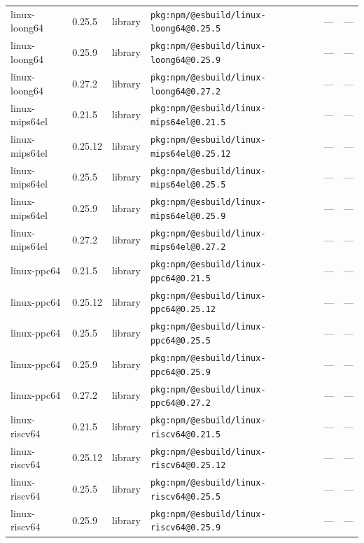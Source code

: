 \documentclass[11pt,a4paper]{article}
\begin{document}
\begin{longtable}{|p{4cm}|p{2cm}|p{1.6cm}|p{5cm}|p{1.5cm}|p{3.5cm}|}
\raggedright linux-loong64 & 0.25.5 & library & \small\texttt{pkg:npm/@esbuild/linux-loong64@0.25.5} & — & \small — \\
\raggedright linux-loong64 & 0.25.9 & library & \small\texttt{pkg:npm/@esbuild/linux-loong64@0.25.9} & — & \small — \\
\raggedright linux-loong64 & 0.27.2 & library & \small\texttt{pkg:npm/@esbuild/linux-loong64@0.27.2} & — & \small — \\
\raggedright linux-mips64el & 0.21.5 & library & \small\texttt{pkg:npm/@esbuild/linux-mips64el@0.21.5} & — & \small — \\
\raggedright linux-mips64el & 0.25.12 & library & \small\texttt{pkg:npm/@esbuild/linux-mips64el@0.25.12} & — & \small — \\
\raggedright linux-mips64el & 0.25.5 & library & \small\texttt{pkg:npm/@esbuild/linux-mips64el@0.25.5} & — & \small — \\
\raggedright linux-mips64el & 0.25.9 & library & \small\texttt{pkg:npm/@esbuild/linux-mips64el@0.25.9} & — & \small — \\
\raggedright linux-mips64el & 0.27.2 & library & \small\texttt{pkg:npm/@esbuild/linux-mips64el@0.27.2} & — & \small — \\
\raggedright linux-ppc64 & 0.21.5 & library & \small\texttt{pkg:npm/@esbuild/linux-ppc64@0.21.5} & — & \small — \\
\raggedright linux-ppc64 & 0.25.12 & library & \small\texttt{pkg:npm/@esbuild/linux-ppc64@0.25.12} & — & \small — \\
\raggedright linux-ppc64 & 0.25.5 & library & \small\texttt{pkg:npm/@esbuild/linux-ppc64@0.25.5} & — & \small — \\
\raggedright linux-ppc64 & 0.25.9 & library & \small\texttt{pkg:npm/@esbuild/linux-ppc64@0.25.9} & — & \small — \\
\raggedright linux-ppc64 & 0.27.2 & library & \small\texttt{pkg:npm/@esbuild/linux-ppc64@0.27.2} & — & \small — \\
\raggedright linux-riscv64 & 0.21.5 & library & \small\texttt{pkg:npm/@esbuild/linux-riscv64@0.21.5} & — & \small — \\
\raggedright linux-riscv64 & 0.25.12 & library & \small\texttt{pkg:npm/@esbuild/linux-riscv64@0.25.12} & — & \small — \\
\raggedright linux-riscv64 & 0.25.5 & library & \small\texttt{pkg:npm/@esbuild/linux-riscv64@0.25.5} & — & \small — \\
\raggedright linux-riscv64 & 0.25.9 & library & \small\texttt{pkg:npm/@esbuild/linux-riscv64@0.25.9} & — & \small — \\

\end{longtable}
\end{document}
